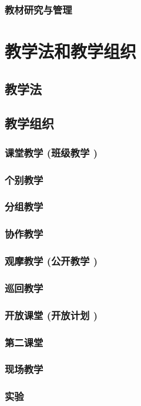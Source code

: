 \documentclass[UTF8]{../../ApplicationUniverse}
\begin{document}
    \subsubsection{教材研究与管理}

\section{教学法和教学组织}
    \subsection{教学法}
    \subsection{教学组织}
        \subsubsection{课堂教学 (班级教学 )}
        \subsubsection{个别教学}
        \subsubsection{分组教学}
        \subsubsection{协作教学}
        \subsubsection{观摩教学 (公开教学 )}
        \subsubsection{巡回教学}
        \subsubsection{开放课堂 (开放计划 )}
        \subsubsection{第二课堂}
        \subsubsection{现场教学}
        \subsubsection{实验}
\end{document}
